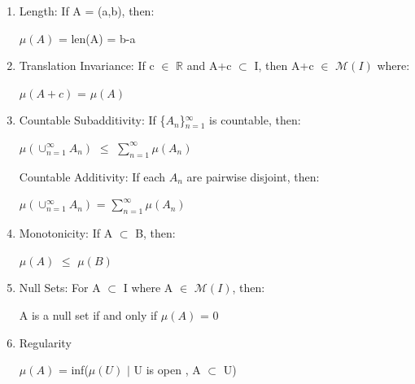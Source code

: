     \begin{enumerate}[label=(\alph*), leftmargin=2cm, itemsep=0.1cm]
        \item {\color{lgreen} Length}:
            If A = (a,b), then:

            \hspace{0.5cm}
            $\mu(A)$ = len(A) = b-a

        \item {\color{lgreen} Translation Invariance}:
            If c $\in$ $\mathbb{R}$ and A+c $\subset$ I, then
            A+c $\in$ $\mathcal{M}(I)$ where:
            
            \hspace{0.5cm}
            $\mu(A+c)$ = $\mu(A)$

        \item {\color{lgreen} Countable Subadditivity}:
            If \{$A_n$\}$_{n=1}^{\infty}$ is countable, then:

            \hspace{0.5cm}
            $\mu(\cup_{n=1}^{\infty} A_n)$
            $\leq$ $\sum_{n=1}^{\infty} \mu(A_n)$

            {\color{lgreen} Countable Additivity}:
            If each $A_n$ are pairwise disjoint, then:

            \hspace{0.5cm}
            $\mu(\cup_{n=1}^{\infty} A_n)$
            = $\sum_{n=1}^{\infty} \mu(A_n)$

        \item {\color{lgreen} Monotonicity}:
            If A $\subset$ B, then:

            \hspace{0.5cm}
            $\mu(A)$ $\leq$ $\mu(B)$

        \item {\color{lgreen} Null Sets}:
            For A $\subset$ I where A $\in$ $\mathcal{M}(I)$, then: 

            \hspace{0.5cm}
            A is a null set if and only if $\mu(A)$ = 0

        \item {\color{lgreen} Regularity}
        
            \hspace{0.5cm}
            $\mu(A)$ = inf($\mu(U)$ $|$ U is open , A $\subset$ U)
    \end{enumerate}

